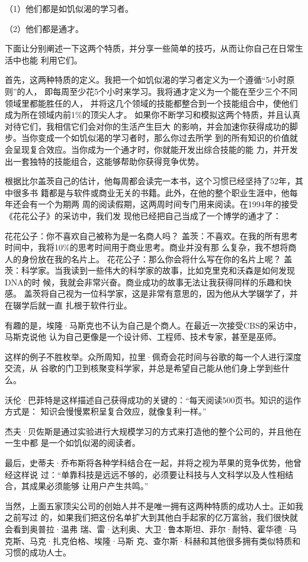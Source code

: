 \documentclass[11pt]{ctexart}
\begin{document}
{{{{（1）他们都是如饥似渴的学习者。

（2）他们都是通才。

下面让分别阐述一下这两个特质，并分享一些简单的技巧，从而让你自己在日常生活中也能
利用它们。

首先，这两种特质的定义。我把一个如饥似渴的学习者定义为一个遵循“5小时原则”的人，
即每周至少花5个小时来学习。我将通才定义为一个能在至少三个不同领域里都能胜任的人，
并将这几个领域的技能都整合到一个技能组合中，使他们成为所在领域内前1\%的顶尖人才。
如果你不断学习和模拟这两个特质，并且认真对待它们，我相信它们会对你的生活产生巨大
的影响，并会加速你获得成功的脚步。当你变成一个如饥似渴的学习者时，那么你过去所学
到的所有知识的价值就会呈现复合效应。当你成为一个通才时，你就能开发出综合技能的能
力，并开发出一套独特的技能组合，这能够帮助你获得竞争优势。

根据比尔盖茨自己的估计，他每周都会读完一本书，这个习惯已经坚持了52年，其中很多书
籍都是与软件或商业无关的书籍。此外，在他的整个职业生涯中，他每年还会有一个为期两
周的阅读假期，这两周时间专门用来阅读。在1994年的接受《花花公子》的采访中，我们发
现他已经把自己当成了一个博学的通才了：

花花公子：你不喜欢自己被称为是一名商人吗？
盖茨：不喜欢。在我的所有思考时间中，我将10\%的思考时间用于商业思考。商业并没有那
么复杂，我不想将商人的身份放在我的名片上。
花花公子：那么你会将什么写在你的名片上呢？
盖茨：科学家。当我读到一些伟大的科学家的故事，比如克里克和沃森是如何发现DNA的时
候，我就会非常兴奋。商业成功的故事无法让我获得同样的乐趣和快感。
盖茨将自己视为一位科学家，这是非常有意思的，因为他从大学辍学了，并在辍学后就一直
扎根于软件行业。

有趣的是，埃隆·马斯克也不认为自己是个商人。在最近一次接受CBS的采访中，马斯克说他
认为自己更像是一个设计师、工程师、技术专家，甚至是巫师。

这样的例子不胜枚举。众所周知，拉里·佩奇会花时间与谷歌的每一个人进行深度交流，从
谷歌的门卫到核聚变科学家，并总是希望自己能从他们身上学到些什么。

沃伦·巴菲特是这样描述自己获得成功的关键的：“每天阅读500页书。知识的运作方式是：
知识会慢慢累积呈复合效应，就像复利一样。”

杰夫·贝佐斯是通过实验进行大规模学习的方式来打造他的整个公司的，并且他在一生中都
是一个如饥似渴的阅读者。

最后，史蒂夫·乔布斯将各种学科结合在一起，并将之视为苹果的竞争优势，他曾经这样说
过：“单靠科技是远远不够的，必须要让科技与人文科学以及人性相结合，其成果必须能够
让用户产生共鸣。”

当然，上面五家顶尖公司的创始人并不是唯一拥有这两种特质的成功人士。正如我之前写过
的，如果我们把这份名单扩大到其他白手起家的亿万富翁，我们很快就会看到奥普拉·温弗
瑞、雷·达利奥、大卫·鲁本斯坦、菲尔·耐特、霍华德·马克斯、马克·扎克伯格、埃隆·马斯
克、查尔斯·科赫和其他很多拥有类似特质和习惯的成功人士。

}}}}
\end{document}
